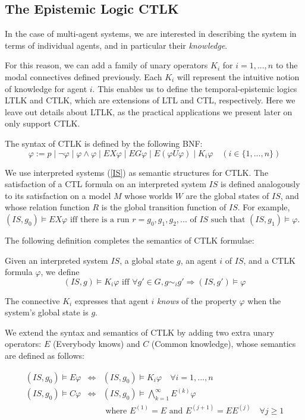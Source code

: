 \documentclass[11pt]{report}
\newenvironment{definition}[1][Definition]{\begin{trivlist}
\item[\hskip \labelsep {\bfseries #1}]}{\end{trivlist}}
\begin{document}
\subsection{The Epistemic Logic CTLK}

In the case of multi-agent systems, we are interested in describing the system in terms of individual agents, and in particular their \textit{knowledge}. 

For this reason, we can add \cite{ctlk} a family of unary operators $K_i$ for $i = 1, ..., n$ to the modal connectives defined previously. Each $K_i$ will represent the intuitive notion of knowledge for agent $i$. 
This enables us to define the temporal-epistemic logics LTLK and CTLK, which are extensions of LTL and CTL, respectively. Here we leave out details about LTLK, as the practical applications we present later on only support CTLK. 



\begin{definition} 
The syntax of CTLK is defined by the following BNF: 
$$ \varphi := p \mid \lnot \varphi \mid \varphi \land \varphi \mid EX\varphi \mid EG\varphi \mid E(\varphi U \varphi) \mid  K_i\varphi \quad (i \in \{1, ..., n\})$$
\end{definition}  

We use interpreted systems (\ref{IS}) as semantic structures for CTLK. The satisfaction of a CTL formula on an interpreted system $IS$ is defined analogously to its satisfaction on a model $M$ whose worlds $W$ are the global states of $IS$, and whose relation function $R$ is the global transition function of $IS$. 
For example, $(IS, g_0) \models EX\varphi \mbox{  iff there is a run } r = g_0, g_1, g_2, ... \mbox{ of $IS$ such that } (IS, g_1) \models \varphi$.

The following definition completes the semantics of CTLK formulae:

\begin{definition}
Given an interpreted system $IS$, a global state $g$, an agent $i$ of $IS$, and a CTLK formula $\varphi$, we define
$$(IS, g) \models K_i \varphi \mbox{  iff  } \forall g' \in G, g \sim_i g' \Rightarrow (IS, g') \models \varphi$$

The connective $K_i$ expresses that agent $i$ \emph{knows} of the property $\varphi$ when the system's global state is $g$.

We extend the syntax and semantics of CTLK by adding two extra unary operators: $E$ (Everybody knows) and $C$ (Common knowledge), whose semantics are defined as follows:

\begin{eqnarray*}
(IS, g_0) \models E\varphi &\Leftrightarrow& (IS, g_0) \models K_i \varphi \quad \forall i = 1, ..., n \\
(IS, g_0) \models C\varphi &\Leftrightarrow&  (IS, g_0) \models \bigwedge^\infty_{k = 1} E^{(k)}\varphi \quad \\&& \mbox{ where } E^{(1)} = E \mbox{ and } E^{(j+1)} = EE^{(j)} \quad \forall j \geq 1
\end{eqnarray*}
\end{definition}
\end{document}
